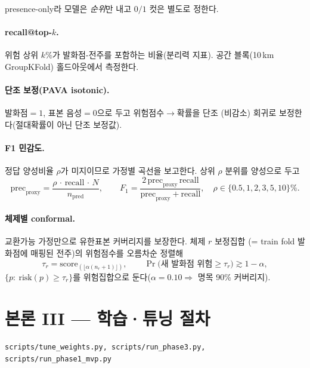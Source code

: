\documentclass[11pt,a4paper]{article}
\newcommand{\src}[1]{{\footnotesize\color{gray}\texttt{#1}}}
\begin{document}
presence-only라 모델은 \emph{순위}만 내고 $0/1$ 컷은 별도로 정한다.

\paragraph{recall@top-$k$.} 위험 상위 $k\%$가 발화점-전주를 포함하는 비율(분리력 지표). 공간 블록(10\,km
GroupKFold) 홀드아웃에서 측정한다.

\paragraph{단조 보정(PAVA isotonic).} 발화점$=1$, 표본 음성$=0$으로 두고 위험점수$\to$확률을 단조
(비감소) 회귀로 보정한다(절대확률이 아닌 단조 보정값).

\paragraph{F1 민감도.} 정답 양성비율 $\rho$가 미지이므로 가정별 곡선을 보고한다. 상위 $\rho$ 분위를
양성으로 두고
\begin{equation}
\text{prec}_{\text{proxy}}=\frac{\rho\,\cdot\,\text{recall}\,\cdot\,N}{n_{\text{pred}}},\qquad
F_1=\frac{2\,\text{prec}_{\text{proxy}}\,\text{recall}}{\text{prec}_{\text{proxy}}+\text{recall}},
\quad \rho\in\{0.5,1,2,3,5,10\}\%.
\label{eq:f1}
\end{equation}

\paragraph{체제별 conformal.} 교환가능 가정만으로 유한표본 커버리지를 보장한다. 체제 $r$ 보정집합
(= train fold 발화점에 매핑된 전주)의 위험점수를 오름차순 정렬해
\begin{equation}
\tau_r=\mathrm{score}_{(\lfloor\alpha(n_r+1)\rfloor)},\qquad
\Pr\!\big(\text{새 발화점 위험}\ge\tau_r\big)\gtrsim 1-\alpha,
\label{eq:conformal}
\end{equation}
$\{p:\ \mathrm{risk}(p)\ge\tau_r\}$를 위험집합으로 둔다($\alpha=0.10\Rightarrow$ 명목 90\% 커버리지).

\section{본론 III — 학습·튜닝 절차}\label{sec:tuning}
\src{scripts/tune\_weights.py, scripts/run\_phase3.py, scripts/run\_phase1\_mvp.py}
\end{document}
